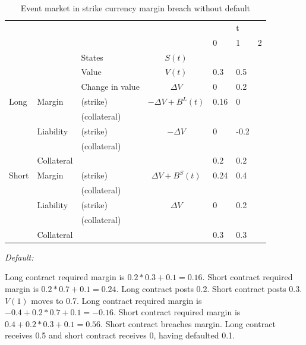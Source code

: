 \documentclass[12pt]{article}
\begin{document}
\begin{table}
\begin{tabular}{lll|c|lll}
&  &  &  &  & t &\\  
&  &  &  & 0 & 1 & 2\\
\hline
\hline
&  & States &  $S(t)$ &   &   & \\
&  & Value  &  $V(t)$  & 0.3 & 0.5 &  \\
&  & Change in value & $\Delta V$ & 0& 0.2 &  \\
\hline
Long      & Margin    & (strike)     & $-\Delta V + B^L(t)$& 0.16 & 0 & \\
          &           & (collateral) & & & &\\ 
          & Liability & (strike)     & $-\Delta V$ & 0 & -0.2 & \\ 
          &           & (collateral)& & & &\\
          & Collateral&                       &    & 0.2 & 0.2 & \\
\hline          
Short     & Margin    & (strike)     & $\Delta V + B^S(t)$ & 0.24 & 0.4 & \\
          &           & (collateral) & & & &\\
          & Liability & (strike)     & $\Delta V$ & 0 & 0.2 &\\
          &           & (collateral) & & & &\\
          & Collateral&                       &    & 0.3 & 0.3 & \\ 
          

\end{tabular}
\caption{Event market in strike currency margin breach without default}
\label{fut}
\end{table}


\textit{Default:}

Long contract required margin is $0.2*0.3 +0.1 = 0.16$.  Short contract required margin is $0.2*0.7 +0.1 = 0.24$. Long contract posts 0.2. Short contract posts 0.3. $V(1)$ moves to 0.7. Long contract required margin is $-0.4+0.2*0.7 + 0.1 = -0.16$. Short contract required margin is $0.4+0.2*0.3 + 0.1 = 0.56$. Short contract breaches margin. Long contract receives 0.5 and short contract receives $0$, having defaulted 0.1.
\end{document}

